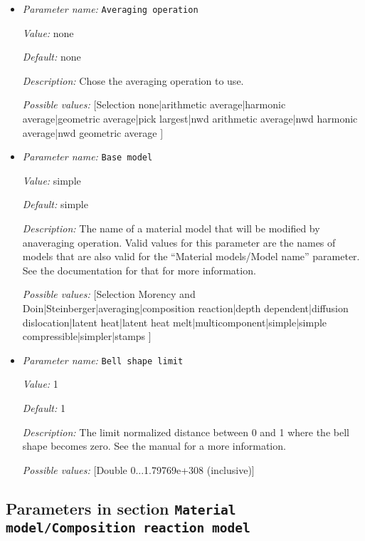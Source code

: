 \begin{itemize}
\item {\it Parameter name:} {\tt Averaging operation}
\label{parameters:Material model/Averaging/Averaging operation}


{\it Value:} none


{\it Default:} none


{\it Description:} Chose the averaging operation to use.


{\it Possible values:} [Selection none|arithmetic average|harmonic average|geometric average|pick largest|nwd arithmetic average|nwd harmonic average|nwd geometric average ]
\item {\it Parameter name:} {\tt Base model}
\label{parameters:Material model/Averaging/Base model}


{\it Value:} simple


{\it Default:} simple


{\it Description:} The name of a material model that will be modified by anaveraging operation. Valid values for this parameter are the names of models that are also valid for the ``Material models/Model name'' parameter. See the documentation for that for more information.


{\it Possible values:} [Selection Morency and Doin|Steinberger|averaging|composition reaction|depth dependent|diffusion dislocation|latent heat|latent heat melt|multicomponent|simple|simple compressible|simpler|stamps ]
\item {\it Parameter name:} {\tt Bell shape limit}
\label{parameters:Material model/Averaging/Bell shape limit}


{\it Value:} 1


{\it Default:} 1


{\it Description:} The limit normalized distance between 0 and 1 where the bell shape becomes zero. See the manual for a more information.


{\it Possible values:} [Double 0...1.79769e+308 (inclusive)]
\end{itemize}

\subsection{Parameters in section \tt Material model/Composition reaction model}
\label{parameters:Material_20model/Composition_20reaction_20model}

